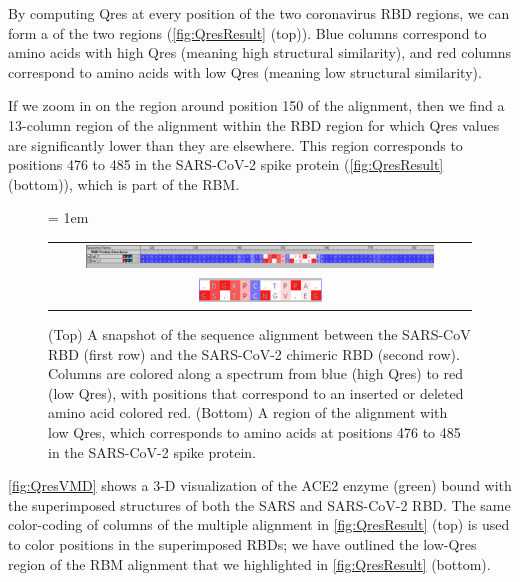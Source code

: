By computing Qres at every position of the two coronavirus RBD regions, we can form a  of the two regions (\autoref{fig:QresResult} (top)). Blue columns correspond to amino acids with high Qres (meaning high structural similarity), and red columns correspond to amino acids with low Qres (meaning low structural similarity).

If we zoom in on the region around position 150 of the alignment, then we find a 13-column region of the alignment within the RBD region for which Qres values are significantly lower than they are elsewhere. This region corresponds to positions 476 to 485 in the SARS-CoV-2 spike protein (\autoref{fig:QresResult} (bottom)), which is part of the RBM.\\

\begin{figure}[h]
	\centering
	\tabcolsep = 1em
	\mySfFamily
	\begin{tabular}{c}
		\includegraphics[width = 0.85\textwidth]{../images/QresResult.png} \\
		\includegraphics[width = 0.3\textwidth]{../images/QresResult_cropped.png} \\
	\end{tabular}
	\caption{(Top) A snapshot of the sequence alignment between the SARS-CoV RBD (first row) and the SARS-CoV-2 chimeric RBD (second row). Columns are colored along a spectrum from blue (high Qres) to red (low Qres), with positions that correspond to an inserted or deleted amino acid colored red. (Bottom) A region of the alignment with low Qres, which corresponds to amino acids at positions 476 to 485 in the SARS-CoV-2 spike protein.}
	\label{fig:QresResult}
\end{figure}

\autoref{fig:QresVMD} shows a 3-D visualization of the ACE2 enzyme (green) bound with the superimposed structures of both the SARS and SARS-CoV-2 RBD. The same color-coding of columns of the multiple alignment in \autoref{fig:QresResult} (top) is used to color positions in the superimposed RBDs; we have outlined the low-Qres region of the RBM alignment that we highlighted in \autoref{fig:QresResult} (bottom).\\

